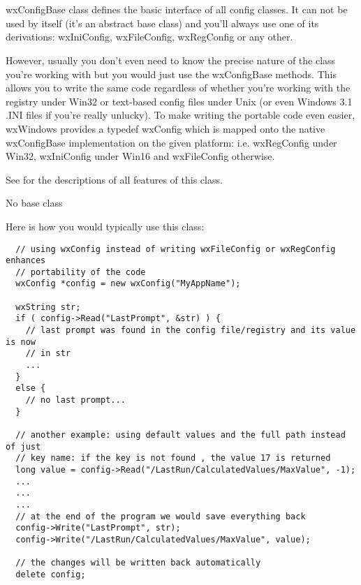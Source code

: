 \section{}\label{wxconfigbase}

wxConfigBase class defines the basic interface of all config classes. It can
not be used by itself (it's an abstract base class) and you'll always use one
of its derivations: wxIniConfig, wxFileConfig, wxRegConfig or
any other.

However, usually you don't even need to know the precise nature of the class
you're working with but you would just use the wxConfigBase methods. This
allows you to write the same code regardless of whether you're working with
the registry under Win32 or text-based config files under Unix (or even
Windows 3.1 .INI files if you're really unlucky). To make writing the portable
code even easier, wxWindows provides a typedef wxConfig
which is mapped onto the native wxConfigBase implementation on the given
platform: i.e. wxRegConfig under Win32, wxIniConfig under Win16 and
wxFileConfig otherwise.

See  for the descriptions of all
features of this class.


No base class


Here is how you would typically use this class:

\begin{verbatim}
  // using wxConfig instead of writing wxFileConfig or wxRegConfig enhances
  // portability of the code
  wxConfig *config = new wxConfig("MyAppName");

  wxString str;
  if ( config->Read("LastPrompt", &str) ) {
    // last prompt was found in the config file/registry and its value is now
    // in str
    ...
  }
  else {
    // no last prompt...
  }

  // another example: using default values and the full path instead of just
  // key name: if the key is not found , the value 17 is returned
  long value = config->Read("/LastRun/CalculatedValues/MaxValue", -1);
  ...
  ...
  ...
  // at the end of the program we would save everything back
  config->Write("LastPrompt", str);
  config->Write("/LastRun/CalculatedValues/MaxValue", value);

  // the changes will be written back automatically
  delete config;
\end{verbatim}

